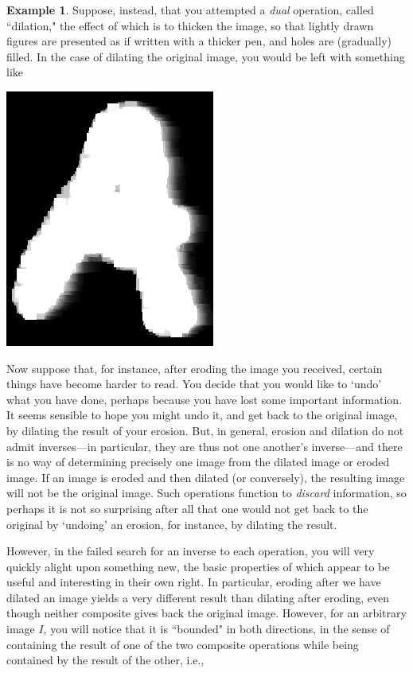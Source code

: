 \documentclass[a4paper]{book}
\theoremstyle{definition}
\newtheorem{example}{Example}[section]
\theoremstyle{definition}
\theoremstyle{definition}
\theoremstyle{theorem}
\theoremstyle{definition}
\begin{document}
\begin{example}
	Suppose, instead, that you attempted a \textit{dual} operation, called ``dilation,"  the effect of which is to thicken the image, so that lightly drawn figures are presented as if written with a thicker pen, and holes are (gradually) filled. In the case of dilating the original image, you would be left with something like 
	\begin{center}
		\includegraphics*[scale=0.25]{LetterAAfterDilate.png}
	\end{center} 
	Now suppose that, for instance, after eroding the image you received, certain things have become harder to read. You decide that you would like to `undo' what you have done, perhaps because you have lost some important information. It seems sensible to hope you might undo it, and get back to the original image, by dilating the result of your erosion. But, in general, erosion and dilation do not admit inverses---in particular, they are thus not one another's inverse---and there is no way of determining precisely one image from the dilated image or eroded image. If an image is eroded and then dilated (or conversely), the resulting image will not be the original image. Such operations function to \textit{discard} information, so perhaps it is not so surprising after all that one would not get back to the original by `undoing' an erosion, for instance, by dilating the result.  \par 
	However, in the failed search for an inverse to each operation, you will very quickly alight upon something new, the basic properties of which appear to be useful and interesting in their own right. In particular, eroding after we have dilated an image yields a very different result than dilating after eroding, even though neither composite gives back the original image. However, for an arbitrary image $I$, you will notice that it is ``bounded" in both directions, in the sense of containing the result of one of the two composite operations while being contained by the result of the other, i.e.,  

\end{example}
\end{document}
